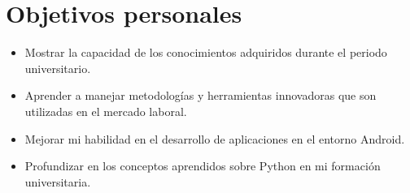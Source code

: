 \section{Objetivos personales}\label{objetivos-personales}

\begin{itemize}
\tightlist
\item
  Mostrar la capacidad de los conocimientos adquiridos durante el periodo universitario.
\item
  Aprender a manejar metodologías y herramientas innovadoras que son utilizadas en el mercado laboral.
\item
  Mejorar mi habilidad en el desarrollo de aplicaciones en el entorno Android.
\item
  Profundizar en los conceptos aprendidos sobre Python en mi formación universitaria.
\end{itemize}

